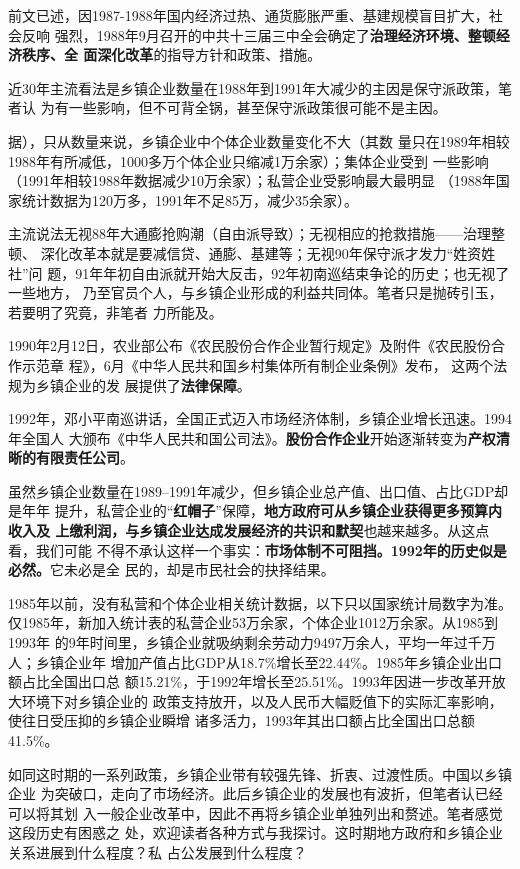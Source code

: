 前文已述，因1987-1988年国内经济过热、通货膨胀严重、基建规模盲目扩大，社会反响
强烈，1988年9月召开的中共十三届三中全会确定了\textbf{治理经济环境、整顿经济秩序、全
  面深化改革}的指导方针和政策、措施。


近30年主流看法是乡镇企业数量在1988年到1991年大减少的主因是保守派政策，笔者认
为有一些影响，但不可背全锅，甚至保守派政策很可能不是主因。

据），只从数量来说，乡镇企业中个体企业数量变化不大（其数
量只在1989年相较1988年有所减低，1000多万个体企业只缩减1万余家）；集体企业受到
一些影响（1991年相较1988年数据减少10万余家）；私营企业受影响最大最明显
（1988年国家统计数据为120万多，1991年不足85万，减少35余家）。

主流说法无视88年大通膨抢购潮（自由派导致）；无视相应的抢救措施——治理整顿、
深化改革本就是要减信贷、通膨、基建等；无视90年保守派才发力“姓资姓社”问
题，91年年初自由派就开始大反击，92年初南巡结束争论的历史；也无视了一些地方，
乃至官员个人，与乡镇企业形成的利益共同体。笔者只是抛砖引玉，若要明了究竟，非笔者
力所能及。



1990年2月12日，农业部公布《农民股份合作企业暂行规定》及附件《农民股份合作示范章
程》，6月《中华人民共和国乡村集体所有制企业条例》发布， 这两个法规为乡镇企业的发
展提供了\textbf{法律保障}。


1992年，邓小平南巡讲话，全国正式迈入市场经济体制，乡镇企业增长迅速。1994年全国人
大颁布《中华人民共和国公司法》。\textbf{股份合作企业}开始逐渐转变为\textbf{产权清
  晰的有限责任公司}。

虽然乡镇企业数量在1989--1991年减少，但乡镇企业总产值、出口值、占比GDP却是年年
提升，私营企业的“\textbf{红帽子}”保障，\textbf{地方政府可从乡镇企业获得更多预算内收入及
  上缴利润，与乡镇企业达成发展经济的共识和默契}也越来越多。从这点看，我们可能
不得不承认这样一个事实：\textbf{市场体制不可阻挡。1992年的历史似是必然。}它未必是全
民的，却是市民社会的抉择结果。

1985年以前，没有私营和个体企业相关统计数据，以下只以国家统计局数字为准。
仅1985年，新加入统计表的私营企业53万余家，个体企业1012万余家。从1985到1993年
的9年时间里，乡镇企业就吸纳剩余劳动力9497万余人，平均一年过千万人；乡镇企业年
增加产值占比GDP从18.7\%增长至22.44\%。1985年乡镇企业出口额占比全国出口总
额15.21\%，于1992年增长至25.51\%。1993年因进一步改革开放大环境下对乡镇企业的
政策支持放开，以及人民币大幅贬值下的实际汇率影响，使往日受压抑的乡镇企业瞬增
诸多活力，1993年其出口额占比全国出口总额41.5\%。

如同这时期的一系列政策，乡镇企业带有较强先锋、折衷、过渡性质。中国以乡镇企业
为突破口，走向了市场经济。此后乡镇企业的发展也有波折，但笔者认已经可以将其划
入一般企业改革中，因此不再将乡镇企业单独列出和赘述。笔者感觉这段历史有困惑之
处，欢迎读者各种方式与我探讨。这时期地方政府和乡镇企业关系进展到什么程度？私
占公发展到什么程度？

